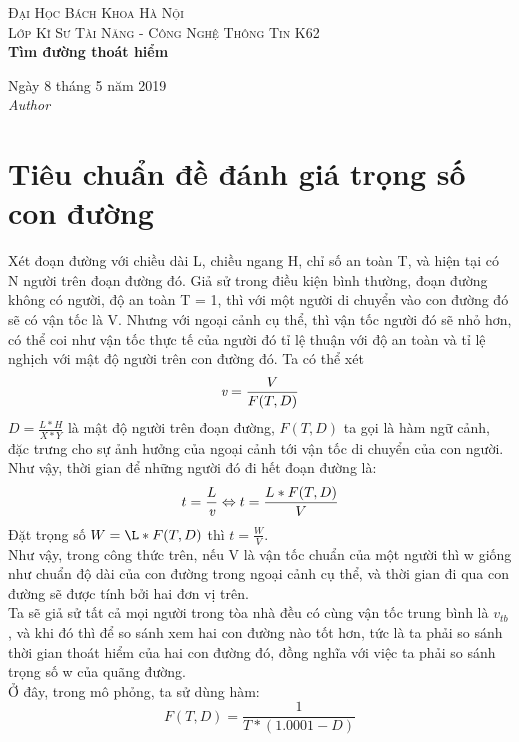 \documentclass{article}
\begin{document}
\textsc{\LARGE Đại Học Bách Khoa Hà Nội} \\[1,5cm]
\textsc{\large Lớp Kĩ Sư Tài Năng - Công Nghệ Thông Tin K62} \\[0.5cm]
{\huge\bfseries Tìm đường thoát hiểm }\\[0.4cm] 

    \begin{flushleft}
        \large
        Ngày 8 tháng 5 năm 2019 \\[0.5cm]
        \textit{Author}\\[0,3cm] 
           
    \end{flushleft}
    
    \section{Tiêu chuẩn đề đánh giá trọng số con đường}
    Xét đoạn đường với chiều dài L, chiều ngang H, chỉ số an toàn T,
    và hiện tại có N người trên đoạn đường đó. Giả sử trong điều 
    kiện bình thường, đoạn đường không có người, độ an toàn T = 1, 
    thì với một người di chuyển vào con đường đó sẽ có vận tốc là V.
    Nhưng với ngoại cảnh cụ thể, thì vận tốc người đó sẽ nhỏ hơn,
    có thể coi như vận tốc thực tế của người đó tỉ lệ thuận với độ 
    an toàn và tỉ lệ nghịch với mật độ người trên con đường đó.
    Ta có thể xét 
    \begin{equation*}
        \emph{v} = \frac{V}{F(T, D)}
    \end{equation*} 
    $D = \frac{L*H}{X*Y}$ là mật độ người trên đoạn đường,
    $F(T, D)$ ta gọi là hàm ngữ cảnh, đặc trưng cho sự ảnh hưởng
    của ngoại cảnh tới vận tốc di chuyển của con người.
    Như vậy, thời gian để những người đó đi hết đoạn đường là:
    \begin{displaymath}
        t = \frac{L}{\emph{v}}  
        \Leftrightarrow t = \frac{L*F(T, D)}{V}   
    \end{displaymath}
    Đặt trọng số $W = \L*F(T, D)$ thì $t = \frac{W}{V}$. \\
    Như vậy, trong công thức trên, nếu V là vận tốc chuẩn của một 
    người thì w giống như chuẩn độ dài của con đường trong ngoại 
    cảnh cụ thể, và thời gian đi qua con đường sẽ được tính bởi 
    hai đơn vị trên. \\
    Ta sẽ giả sử tất cả mọi người trong tòa nhà đều có cùng vận tốc
    trung bình là $v_{tb}$, và khi đó thì để so sánh xem hai con
    đường nào tốt hơn, tức là ta phải so sánh thời gian thoát hiểm 
    của hai con đường đó, đồng nghĩa với việc ta phải so sánh trọng 
    số w của quãng đường. \\ 
    Ở đây, trong mô phỏng, ta sử dùng hàm:
    \begin{equation}
        F(T, D) = \frac{1}{T * (1.0001 - D)}
    \end{equation}
    
\end{document}
